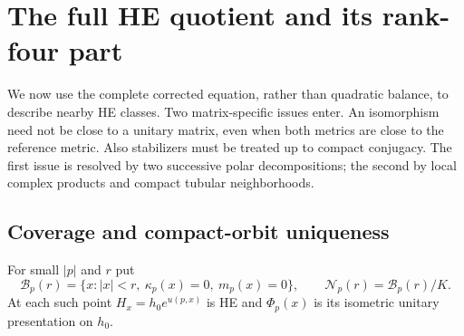 \documentclass[11pt]{amsart}
\theoremstyle{definition}
\theoremstyle{remark}
\newcommand{\cB}{\mathcal B}
\newcommand{\cN}{\mathcal N}
\begin{document}
\section{The full HE quotient and its rank-four part}\label{sec:quotient}

We now use the complete corrected equation, rather than quadratic
balance, to describe nearby HE classes. Two matrix-specific issues
enter. An isomorphism need not be close to a unitary matrix, even
when both metrics are close to the reference metric. Also stabilizers
must be treated up to compact conjugacy. The first issue is resolved
by two successive polar decompositions; the second by local complex
products and compact tubular neighborhoods.

\subsection{Coverage and compact-orbit uniqueness}
For small $|p|$ and $r$ put
\begin{equation}\label{eq:corrected-quotient}
 \cB_p(r)=\{x:|x|<r,\ \kappa_p(x)=0,\ m_p(x)=0\},
 \qquad \cN_p(r)=\cB_p(r)/K.
\end{equation}
At each such point $H_x=h_0e^{u(p,x)}$ is HE and
$\Phi_p(x)$ is its isometric unitary presentation on $h_0$.
\end{document}

